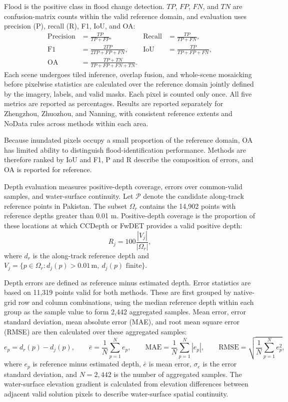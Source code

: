 \documentclass[authoryear,preprint,12pt]{elsarticle}
\begin{document}
Flood is the positive class in flood change detection. \(TP\), \(FP\), \(FN\), and \(TN\) are confusion-matrix counts within the valid reference domain, and evaluation uses precision (P), recall (R), F1, IoU, and OA:
\begin{align}
 \mathrm{Precision}&=\frac{TP}{TP+FP}, & \mathrm{Recall}&=\frac{TP}{TP+FN},\label{eq:precision}\\
 \mathrm{F1}&=\frac{2TP}{2TP+FP+FN}, & \mathrm{IoU}&=\frac{TP}{TP+FP+FN},\label{eq:f1}\\
 \mathrm{OA}&=\frac{TP+TN}{TP+FP+FN+TN}.\label{eq:oa}
\end{align}
Each scene undergoes tiled inference, overlap fusion, and whole-scene mosaicking before pixelwise statistics are calculated over the reference domain jointly defined by the imagery, labels, and valid masks. Each pixel is counted only once. All five metrics are reported as percentages. Results are reported separately for Zhengzhou, Zhuozhou, and Nanning, with consistent reference extents and NoData rules across methods within each area.

Because inundated pixels occupy a small proportion of the reference domain, OA has limited ability to distinguish flood-identification performance. Methods are therefore ranked by IoU and F1, P and R describe the composition of errors, and OA is reported for reference.

Depth evaluation measures positive-depth coverage, errors over common-valid samples, and water-surface continuity. Let \(\mathcal P\) denote the candidate along-track reference points in Pakistan. The subset \(\Omega_r\) contains the 14,902 points with reference depths greater than 0.01 m. Positive-depth coverage is the proportion of these locations at which CCDepth or FwDET provides a valid positive depth:
\begin{equation}\label{eq:valid_depth_ratio}
 R_j=100\frac{|V_j|}{|\Omega_r|},
\end{equation}
where \(d_r\) is the along-track reference depth and \(V_j=\{p\in\Omega_r:d_j(p)>0.01\,\mathrm m,\ d_j(p)\text{ finite}\}\).

Depth errors are defined as reference minus estimated depth. Error statistics are based on 11,319 points valid for both methods. These are first grouped by native-grid row and column combinations, using the median reference depth within each group as the sample value to form 2,442 aggregated samples. Mean error, error standard deviation, mean absolute error (MAE), and root mean square error (RMSE) are then calculated over these aggregated samples:
\begin{equation}\label{eq:depth_error_stats}
 e_p=d_r(p)-d_j(p),\qquad
 \bar e=\frac{1}{N}\sum_{p=1}^{N}e_p,\qquad
 \mathrm{MAE}=\frac{1}{N}\sum_{p=1}^{N}\left|e_p\right|,\qquad
 \mathrm{RMSE}=\sqrt{\frac{1}{N}\sum_{p=1}^{N}e_p^{2}},
\end{equation}
where \(e_p\) is reference minus estimated depth, \(\bar e\) is mean error, \(\sigma_e\) is the error standard deviation, and \(N=2{,}442\) is the number of aggregated samples. The water-surface elevation gradient is calculated from elevation differences between adjacent valid solution pixels to describe water-surface spatial continuity.
\end{document}
